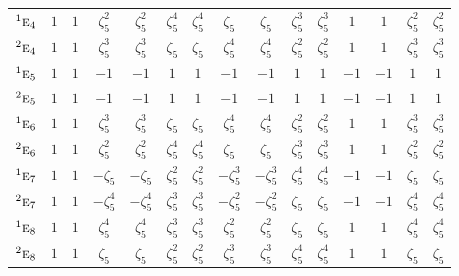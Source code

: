 \documentclass[10pt,a4paper]{article}
\numberwithin{equation}{section}
\newcommand{\irr}[1]{\text{\normalfont\scshape #1}}
\newcommand{\conjpair}[1]{{}^{#1}}
\newcommand{\rootunity}[1]{\zeta_{#1}}
\begin{document}
{\begin{longtable}{@{}lcccccccccccccc@{}}
$\conjpair{1}\irr{e}_{4}$ & $1$ & $1$ & $\rootunity{5}^{2}$ & $\rootunity{5}^{2}$ & $\rootunity{5}^{4}$ & $\rootunity{5}^{4}$ & $\rootunity{5}$ & $\rootunity{5}$ & $\rootunity{5}^{3}$ & $\rootunity{5}^{3}$ & $1$ & $1$ & $\rootunity{5}^{2}$ & $\rootunity{5}^{2}$\\
$\conjpair{2}\irr{e}_{4}$ & $1$ & $1$ & $\rootunity{5}^{3}$ & $\rootunity{5}^{3}$ & $\rootunity{5}$ & $\rootunity{5}$ & $\rootunity{5}^{4}$ & $\rootunity{5}^{4}$ & $\rootunity{5}^{2}$ & $\rootunity{5}^{2}$ & $1$ & $1$ & $\rootunity{5}^{3}$ & $\rootunity{5}^{3}$\\
$\conjpair{1}\irr{e}_{5}$ & $1$ & $1$ & $-1$ & $-1$ & $1$ & $1$ & $-1$ & $-1$ & $1$ & $1$ & $-1$ & $-1$ & $1$ & $1$\\
$\conjpair{2}\irr{e}_{5}$ & $1$ & $1$ & $-1$ & $-1$ & $1$ & $1$ & $-1$ & $-1$ & $1$ & $1$ & $-1$ & $-1$ & $1$ & $1$\\
$\conjpair{1}\irr{e}_{6}$ & $1$ & $1$ & $\rootunity{5}^{3}$ & $\rootunity{5}^{3}$ & $\rootunity{5}$ & $\rootunity{5}$ & $\rootunity{5}^{4}$ & $\rootunity{5}^{4}$ & $\rootunity{5}^{2}$ & $\rootunity{5}^{2}$ & $1$ & $1$ & $\rootunity{5}^{3}$ & $\rootunity{5}^{3}$\\
$\conjpair{2}\irr{e}_{6}$ & $1$ & $1$ & $\rootunity{5}^{2}$ & $\rootunity{5}^{2}$ & $\rootunity{5}^{4}$ & $\rootunity{5}^{4}$ & $\rootunity{5}$ & $\rootunity{5}$ & $\rootunity{5}^{3}$ & $\rootunity{5}^{3}$ & $1$ & $1$ & $\rootunity{5}^{2}$ & $\rootunity{5}^{2}$\\
$\conjpair{1}\irr{e}_{7}$ & $1$ & $1$ & $-\rootunity{5}$ & $-\rootunity{5}$ & $\rootunity{5}^{2}$ & $\rootunity{5}^{2}$ & $-\rootunity{5}^{3}$ & $-\rootunity{5}^{3}$ & $\rootunity{5}^{4}$ & $\rootunity{5}^{4}$ & $-1$ & $-1$ & $\rootunity{5}$ & $\rootunity{5}$\\
$\conjpair{2}\irr{e}_{7}$ & $1$ & $1$ & $-\rootunity{5}^{4}$ & $-\rootunity{5}^{4}$ & $\rootunity{5}^{3}$ & $\rootunity{5}^{3}$ & $-\rootunity{5}^{2}$ & $-\rootunity{5}^{2}$ & $\rootunity{5}$ & $\rootunity{5}$ & $-1$ & $-1$ & $\rootunity{5}^{4}$ & $\rootunity{5}^{4}$\\
$\conjpair{1}\irr{e}_{8}$ & $1$ & $1$ & $\rootunity{5}^{4}$ & $\rootunity{5}^{4}$ & $\rootunity{5}^{3}$ & $\rootunity{5}^{3}$ & $\rootunity{5}^{2}$ & $\rootunity{5}^{2}$ & $\rootunity{5}$ & $\rootunity{5}$ & $1$ & $1$ & $\rootunity{5}^{4}$ & $\rootunity{5}^{4}$\\
$\conjpair{2}\irr{e}_{8}$ & $1$ & $1$ & $\rootunity{5}$ & $\rootunity{5}$ & $\rootunity{5}^{2}$ & $\rootunity{5}^{2}$ & $\rootunity{5}^{3}$ & $\rootunity{5}^{3}$ & $\rootunity{5}^{4}$ & $\rootunity{5}^{4}$ & $1$ & $1$ & $\rootunity{5}$ & $\rootunity{5}$\\

\end{longtable}}
\end{document}
